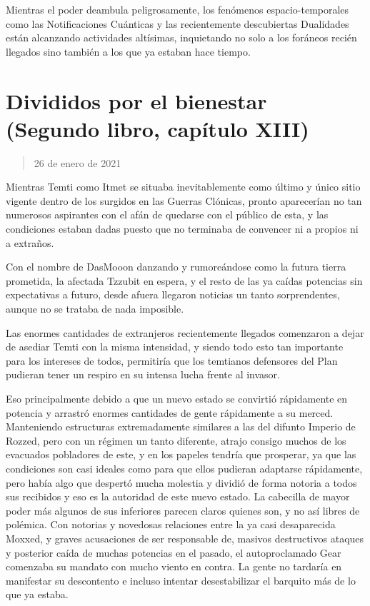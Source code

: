 \documentclass[
]{book}
\begin{document}
Mientras el poder deambula peligrosamente, los fenómenos espacio-temporales como las Notificaciones Cuánticas y las recientemente descubiertas Dualidades están alcanzando actividades altísimas, inquietando no solo a los foráneos recién llegados sino también a los que ya estaban hace tiempo.

\hypertarget{divididos-por-el-bienestar-segundo-libro-capuxedtulo-xiii}{%
\section{Divididos por el bienestar (Segundo libro, capítulo XIII)}\label{divididos-por-el-bienestar-segundo-libro-capuxedtulo-xiii}}

\begin{quote}
26 de enero de 2021
\end{quote}

Mientras Temti como Itmet se situaba inevitablemente como último y único sitio vigente dentro de los surgidos en las Guerras Clónicas, pronto aparecerían no tan numerosos aspirantes con el afán de quedarse con el público de esta, y las condiciones estaban dadas puesto que no terminaba de convencer ni a propios ni a extraños.

Con el nombre de DasMooon danzando y rumoreándose como la futura tierra prometida, la afectada Tzzubit en espera, y el resto de las ya caídas potencias sin expectativas a futuro, desde afuera llegaron noticias un tanto sorprendentes, aunque no se trataba de nada imposible.

Las enormes cantidades de extranjeros recientemente llegados comenzaron a dejar de asediar Temti con la misma intensidad, y siendo todo esto tan importante para los intereses de todos, permitiría que los temtianos defensores del Plan pudieran tener un respiro en su intensa lucha frente al invasor.

Eso principalmente debido a que un nuevo estado se convirtió rápidamente en potencia y arrastró enormes cantidades de gente rápidamente a su merced. Manteniendo estructuras extremadamente similares a las del difunto Imperio de Rozzed, pero con un régimen un tanto diferente, atrajo consigo muchos de los evacuados pobladores de este, y en los papeles tendría que prosperar, ya que las condiciones son casi ideales como para que ellos pudieran adaptarse rápidamente, pero había algo que despertó mucha molestia y dividió de forma notoria a todos sus recibidos y eso es la autoridad de este nuevo estado. La cabecilla de mayor poder más algunos de sus inferiores parecen claros quienes son, y no así libres de polémica. Con notorias y novedosas relaciones entre la ya casi desaparecida Moxxed, y graves acusaciones de ser responsable de, masivos destructivos ataques y posterior caída de muchas potencias en el pasado, el autoproclamado Gear comenzaba su mandato con mucho viento en contra. La gente no tardaría en manifestar su descontento e incluso intentar desestabilizar el barquito más de lo que ya estaba.
\end{document}
